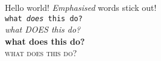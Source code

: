 \documentclass{article}
\begin{document}
 
Hello world! \emph{Emphasised} words stick out!\\
\texttt{what \textit{does} this do?}\\ %
\textit{what DOES this do?}\\ %
\textbf{what does this do?}\\ %
\textsc{what does this do?}\\ %
\end{document}

